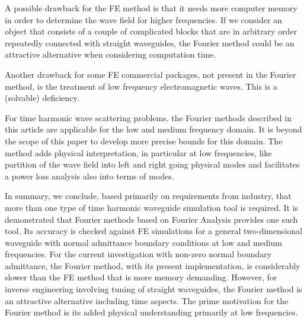 \documentclass{svjour3}
\begin{document}
A possible drawback for the FE method is that it needs more computer
memory in order to determine the wave field for higher frequencies.
If we consider an object that consists of a couple of complicated
blocks that are in arbitrary order repeatedly connected with straight
waveguides, the Fourier method could be an attractive alternative when
considering computation time.

Another drawback for some FE commercial packages, not present in the
Fourier method, is the treatment of low frequency
electromagnetic waves. This is a (solvable)
\cite{AndriulliCoolsOlyslagerMichielssen2008,chew2014} deficiency.

For time harmonic wave scattering problems, the Fourier methods
described in this article are applicable for the low and medium
frequency domain. It is beyond the scope of this paper to develop more
precise bounds for this domain. The method adds physical
interpretation, in particular at low frequencies, like partition of
the wave field into left and right going physical modes and
facilitates a power loss analysis also into terms of modes.

In summary, we conclude, based primarily on requirements from
industry, that more than one type of time harmonic waveguide
simulation tool is required. It is demonstrated that Fourier
methods based on Fourier Analysis provides one such tool. Its accuracy
is checked against FE simulations for a general two-dimensional
waveguide with normal admittance boundary conditions at low and medium
frequencies. For the current investigation with non-zero normal
boundary admittance, the Fourier method, with its present
implementation, is considerably slower than the FE method that is more
memory demanding. However, for inverse engineering involving tuning of
straight waveguides, the Fourier method is an attractive
alternative including time aspects. The prime motivation for the
Fourier method is its added physical understanding primarily
at low frequencies.
\end{document}
